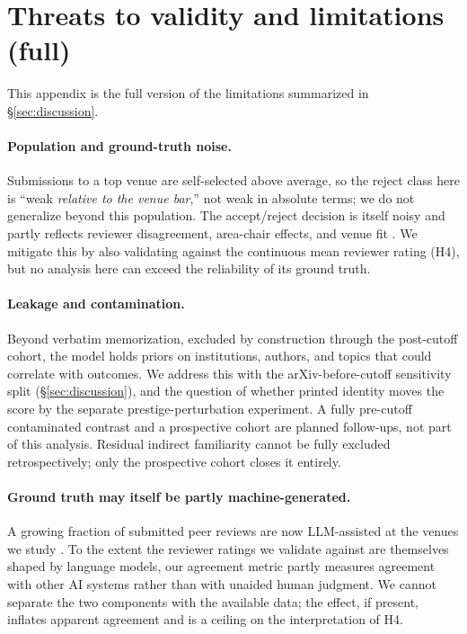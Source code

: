 \section{Threats to validity and limitations (full)}
\label{sec:limits}

This appendix is the full version of the limitations summarized in \S\ref{sec:discussion}.

\paragraph{Population and ground-truth noise.}
Submissions to a top venue are self-selected above average, so the reject class here
is ``weak \emph{relative to the venue bar},'' not weak in absolute terms; we do not
generalize beyond this population. The accept/reject decision is itself noisy and
partly reflects reviewer disagreement, area-chair effects, and venue fit
\citep{cortes2021inconsistency,beygelzimer2023arbitrary}. We mitigate this by also
validating against the continuous mean reviewer rating (H4), but no analysis here can
exceed the reliability of its ground truth.

\paragraph{Leakage and contamination.}
Beyond verbatim memorization, excluded by construction through the post-cutoff cohort,
the model holds priors on institutions, authors, and topics that could correlate with
outcomes. We address this with the arXiv-before-cutoff sensitivity split
(\S\ref{sec:discussion}), and the question of whether printed identity moves the score
by the separate prestige-perturbation experiment. A fully pre-cutoff contaminated
contrast and a prospective cohort are planned follow-ups, not part of this analysis.
Residual indirect familiarity cannot be fully excluded retrospectively; only the
prospective cohort closes it entirely.

\paragraph{Ground truth may itself be partly machine-generated.}
A growing fraction of submitted peer reviews are now LLM-assisted at the venues we
study \citep{liang2024monitoring}. To the extent the reviewer ratings we validate
against are themselves shaped by language models, our agreement metric partly measures
agreement with other AI systems rather than with unaided human judgment. We cannot
separate the two components with the available data; the effect, if present, inflates
apparent agreement and is a ceiling on the interpretation of H4.

